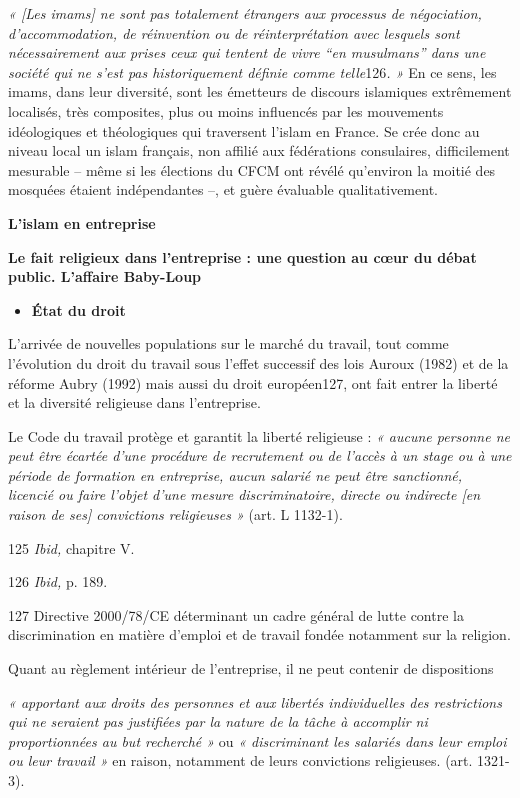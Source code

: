 \emph{« {[}Les imams{]} ne sont pas totalement étrangers aux processus
de négociation, d'accommodation, de réinvention ou de réinterprétation
avec lesquels sont nécessairement aux prises ceux qui tentent de vivre
``en musulmans'' dans une société qui ne s'est pas historiquement
définie comme telle}126\emph{. »} En ce sens, les imams, dans leur
diversité, sont les émetteurs de discours islamiques extrêmement
localisés, très composites, plus ou moins influencés par les mouvements
idéologiques et théologiques qui traversent l'islam en France. Se crée
donc au niveau local un islam français, non affilié aux fédérations
consulaires, difficilement mesurable -- même si les élections du CFCM
ont révélé qu'environ la moitié des mosquées étaient indépendantes --,
et guère évaluable qualitativement.

\textbf{L'islam en entreprise}

\textbf{Le fait religieux dans l'entreprise : une question au cœur du
débat public. L'affaire Baby-Loup}


\begin{itemize}
\item
  \textbf{État du droit}
\end{itemize}


L'arrivée de nouvelles populations sur le marché du travail, tout comme
l'évolution du droit du travail sous l'effet successif des lois Auroux
(1982) et de la réforme Aubry (1992) mais aussi du droit européen127,
ont fait entrer la liberté et la diversité religieuse dans l'entreprise.

Le Code du travail protège et garantit la liberté religieuse : \emph{«
aucune personne ne peut être écartée d'une procédure de recrutement ou
de l'accès à un stage ou à une période de formation en entreprise, aucun
salarié ne peut être sanctionné, licencié ou faire l'objet d'une mesure
discriminatoire, directe ou indirecte {[}en raison de ses{]} convictions
religieuses »} (art. L 1132-1).

125 \emph{Ibid,} chapitre V.

126 \emph{Ibid,} p. 189.

127 Directive 2000/78/CE déterminant un cadre général de lutte contre la
discrimination en matière d'emploi et de travail fondée notamment sur la
religion.



Quant au règlement intérieur de l'entreprise, il ne peut contenir de
dispositions

\emph{« apportant aux droits des personnes et aux libertés individuelles
des restrictions qui ne seraient pas justifiées par la nature de la
tâche à accomplir ni proportionnées au but recherché »} ou \emph{«
discriminant les salariés dans leur emploi ou leur travail »} en raison,
notamment de leurs convictions religieuses. (art. 1321-3).

